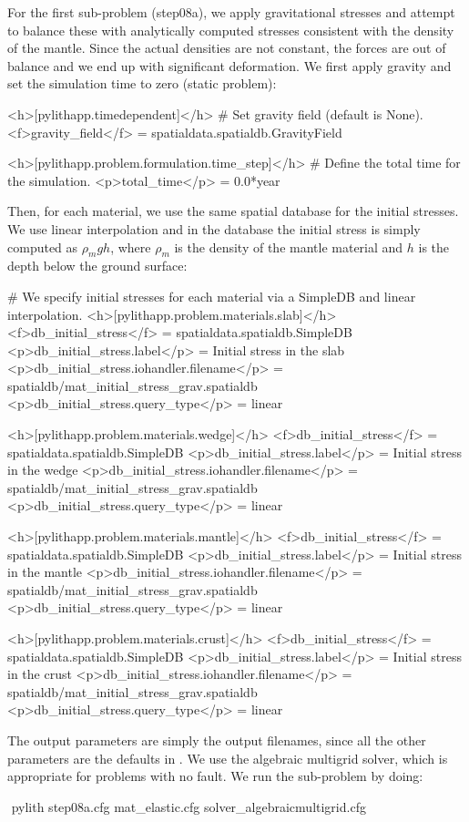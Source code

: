 For the first sub-problem (step08a), we apply gravitational stresses
and attempt to balance these with analytically computed stresses
consistent with the density of the mantle. Since the actual densities
are not constant, the forces are out of balance and we end up with
significant deformation. We first apply gravity and set the simulation
time to zero (static problem):
\begin{cfg}
<h>[pylithapp.timedependent]</h>
# Set gravity field (default is None).
<f>gravity_field</f> = spatialdata.spatialdb.GravityField

<h>[pylithapp.problem.formulation.time_step]</h>
# Define the total time for the simulation.
<p>total_time</p> = 0.0*year
\end{cfg}
Then, for each material, we use the same spatial database for the
initial stresses. We use linear interpolation and in the database the
initial stress is simply computed as $\rho_mgh$, where $\rho_m$ is
the density of the mantle material and $h$ is the depth below the
ground surface:
\begin{cfg}
# We specify initial stresses for each material via a SimpleDB and linear interpolation.
<h>[pylithapp.problem.materials.slab]</h>
<f>db_initial_stress</f> = spatialdata.spatialdb.SimpleDB
<p>db_initial_stress.label</p> = Initial stress in the slab
<p>db_initial_stress.iohandler.filename</p> = spatialdb/mat_initial_stress_grav.spatialdb
<p>db_initial_stress.query_type</p> = linear

<h>[pylithapp.problem.materials.wedge]</h>
<f>db_initial_stress</f> = spatialdata.spatialdb.SimpleDB
<p>db_initial_stress.label</p> = Initial stress in the wedge
<p>db_initial_stress.iohandler.filename</p> = spatialdb/mat_initial_stress_grav.spatialdb
<p>db_initial_stress.query_type</p> = linear

<h>[pylithapp.problem.materials.mantle]</h>
<f>db_initial_stress</f> = spatialdata.spatialdb.SimpleDB
<p>db_initial_stress.label</p> = Initial stress in the mantle
<p>db_initial_stress.iohandler.filename</p> = spatialdb/mat_initial_stress_grav.spatialdb
<p>db_initial_stress.query_type</p> = linear

<h>[pylithapp.problem.materials.crust]</h>
<f>db_initial_stress</f> = spatialdata.spatialdb.SimpleDB
<p>db_initial_stress.label</p> = Initial stress in the crust
<p>db_initial_stress.iohandler.filename</p> = spatialdb/mat_initial_stress_grav.spatialdb
<p>db_initial_stress.query_type</p> = linear
\end{cfg}

The output parameters are simply the output filenames, since all the
other parameters are the defaults in . We use
the algebraic multigrid solver, which is appropriate for problems with
no fault. We run the sub-problem by doing:
\begin{shell}
$$ pylith step08a.cfg mat_elastic.cfg solver_algebraicmultigrid.cfg
\end{shell}

